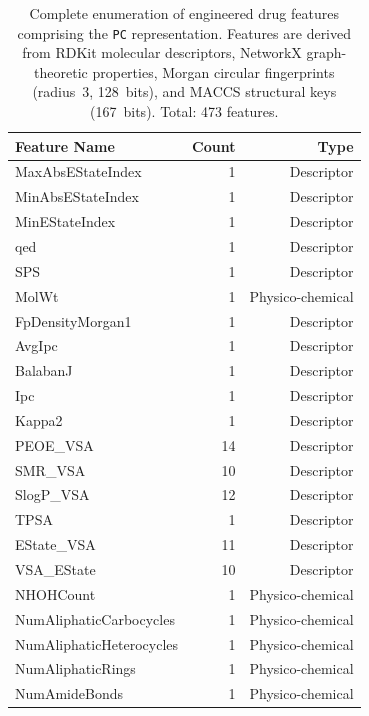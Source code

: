 \documentclass{article}
\begin{document}
\begin{table}[!ht]
\centering
\caption{Complete enumeration of engineered drug features comprising the
\texttt{PC} representation. Features are derived from RDKit molecular
descriptors, NetworkX graph-theoretic properties, Morgan circular fingerprints
(radius~3, 128~bits), and MACCS structural keys (167~bits). Total: 473 features.}
\label{tab:drug_features_supp}
\scriptsize
\begin{tabular}{lrr}
\toprule
\textbf{Feature Name} & \textbf{Count} & \textbf{Type} \\
\midrule
MaxAbsEStateIndex        & 1   & Descriptor \\
MinAbsEStateIndex        & 1   & Descriptor \\
MinEStateIndex           & 1   & Descriptor \\
qed                      & 1   & Descriptor \\
SPS                      & 1   & Descriptor \\
MolWt                    & 1   & Physico-chemical \\
FpDensityMorgan1         & 1   & Descriptor \\
AvgIpc                   & 1   & Descriptor \\
BalabanJ                 & 1   & Descriptor \\
Ipc                      & 1   & Descriptor \\
Kappa2                   & 1   & Descriptor \\
PEOE\_VSA                & 14  & Descriptor \\
SMR\_VSA                 & 10  & Descriptor \\
SlogP\_VSA               & 12  & Descriptor \\
TPSA                     & 1   & Descriptor \\
EState\_VSA              & 11  & Descriptor \\
VSA\_EState              & 10  & Descriptor \\
NHOHCount                & 1   & Physico-chemical \\
NumAliphaticCarbocycles  & 1   & Physico-chemical \\
NumAliphaticHeterocycles & 1   & Physico-chemical \\
NumAliphaticRings        & 1   & Physico-chemical \\
NumAmideBonds            & 1   & Physico-chemical \\

\end{tabular}
\end{table}
\end{document}
